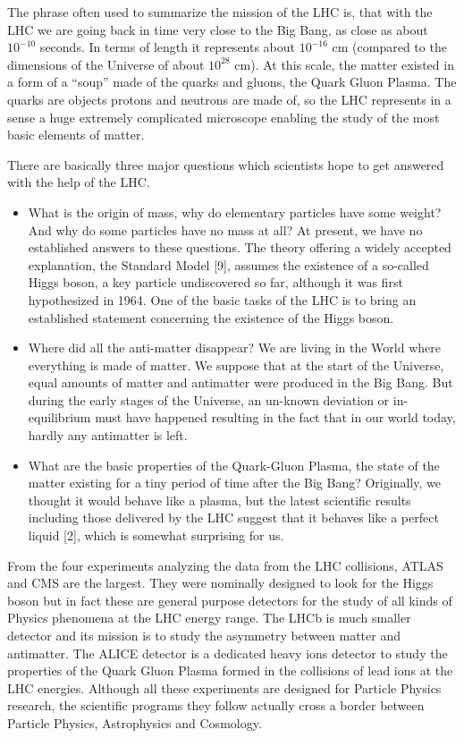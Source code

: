 \documentclass{intech}
\begin{document}
The phrase often used to summarize the mission of the LHC is, that
with the LHC we are going back in time very close to the Big Bang,
as close as about $10^{-10}$ seconds. In terms of length it represents
about $10^{-16}$ cm (compared to the dimensions of the Universe of about
$10^{28}$ cm). At this scale, the matter existed in a form of a ``soup''
made of the quarks and gluons, the Quark Gluon Plasma. The quarks
are objects protons and neutrons are made of, so the LHC represents
in a sense a huge extremely complicated microscope enabling the
study of the most basic elements of matter.

There are basically three major questions which scientists hope to
get answered with the help of the LHC.

\begin{itemize}
\item What is the origin of mass, why do elementary particles have
some weight? And why do some particles have no mass at all? At
present, we have no established answers to these questions. The
theory offering a widely accepted explanation, the Standard Model
[9], assumes the existence of a so-called Higgs boson, a key particle
undiscovered so far, although it was first hypothesized in 1964. One
of the basic tasks of the LHC is to bring an established statement
concerning the existence of the Higgs boson.

\item Where did all the anti-matter disappear? We are living in the
World where everything is made of matter. We suppose that at the
start of the Universe, equal amounts of matter and antimatter were
produced in the Big Bang. But during the early stages of the
Universe, an un-known deviation or in-equilibrium must have happened
resulting in the fact that in our world today, hardly any antimatter
is left.

\item What are the basic properties of the Quark-Gluon Plasma, the
state of the matter existing for a tiny period of time after the Big
Bang? Originally, we thought it would behave like a plasma, but the
latest scientific results including those delivered by the LHC
suggest that it behaves like a perfect liquid [2],
which is somewhat surprising for us.
\end{itemize}

From the four experiments analyzing the data from the LHC
collisions, ATLAS and CMS are the largest. They were nominally
designed to look for the Higgs boson but in fact these are general
purpose detectors for the study of all kinds of Physics phenomena at
the LHC  energy range. The LHCb is much smaller detector and its
mission is to study the asymmetry between matter and antimatter. The
ALICE  detector is a dedicated heavy ions detector to study the
properties of the Quark Gluon Plasma formed in the collisions of
lead ions  at the LHC energies. Although all these experiments are
designed for Particle Physics research, the scientific programs they
follow actually cross a border between Particle Physics,
Astrophysics and Cosmology.
\end{document}
